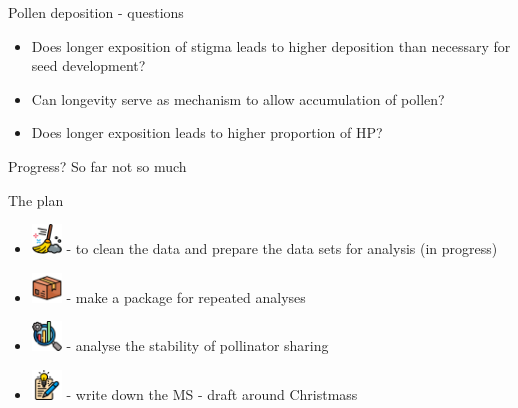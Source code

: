 \documentclass[
  ignorenonframetext,
  aspectratio=169,
]{beamer}
\begin{document}
\begin{frame}{}
\begin{block}{Pollen deposition - questions}
\label{pollen-deposition---questions}
\begin{itemize}
\item
  Does longer exposition of stigma leads to higher deposition than
  necessary for seed development?
\item
  Can longevity serve as mechanism to allow accumulation of pollen?
\item
  Does longer exposition leads to higher proportion of HP?
\end{itemize}
\end{block}

\begin{block}{Progress?}
\label{progress}
So far not so much
\end{block}

\begin{block}{The plan}
\label{the-plan}
\begin{figure}

\begin{minipage}{0.95\linewidth}

\end{minipage}%

\end{figure}%

\begin{itemize}
\item
  \includegraphics[width=0.3125in,height=\textheight,keepaspectratio]{images/clipboard-2969939425.png}
  - to clean the data and prepare the data sets for analysis (in
  progress)
\item
  \includegraphics[width=0.3125in,height=\textheight,keepaspectratio]{images/clipboard-3558150951.png}
  - make a package for repeated analyses
\item
  \includegraphics[width=0.3125in,height=\textheight,keepaspectratio]{images/clipboard-229370691.png}
  - analyse the stability of pollinator sharing
\item
  \includegraphics[width=0.3125in,height=\textheight,keepaspectratio]{images/clipboard-2272430511.png}
  - write down the MS - draft around Christmass
\end{itemize}
\end{block}


\end{frame}
\end{document}
